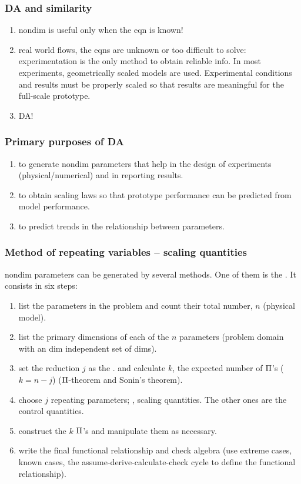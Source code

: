 \subsubsection{DA and similarity}
\begin{enumerate}
%
\item nondim is useful only when the eqn is known!
%
\item real world flows, the eqns are unknown or too difficult to solve: experimentation is the only method to obtain reliable info. In most experiments, geometrically scaled models are used. Experimental conditions and results must be properly scaled so that results are meaningful for the full-scale prototype.
%
\item DA!
%
\end{enumerate}


\subsubsection{Primary purposes of DA}
\begin{enumerate}
%
\item to generate nondim parameters that help in the design of experiments (physical/numerical) and in reporting results.
%
\item to obtain scaling laws so that prototype performance can be predicted from model performance.
%
\item to predict trends in the relationship between parameters.
%
\end{enumerate}


\subsubsection{Method of repeating variables -- scaling quantities}
nondim parameters can be generated by several methods. One of them is the . It consists in six steps:
%
\begin{enumerate}
%
\item list the parameters in the problem and count their total number, $n$ (physical model).
%
\item list the primary dimensions of each of the $n$ parameters (problem domain with an dim independent set of dims).
%
\item set the reduction $j$ as the . and calculate $k$, the expected number of $\Pi$'s ($k = n 
- j$) ($\Pi$-theorem and Sonin's theorem).
%
\item choose $j$ repeating parameters; \ie, scaling quantities. The other ones are the control quantities.
%
\item construct the $k$ $\Pi$'s and manipulate them as necessary.
%
\item write the final functional relationship and check algebra (use extreme cases, known cases, the assume-derive-calculate-check cycle to define the functional relationship).
%
\end{enumerate}


